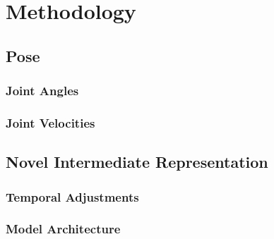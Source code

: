 
\chapter{Methodology} %

\label{Methodology} %

\section{Pose}

\subsection{Joint Angles}

\subsection{Joint Velocities}

\section{Novel Intermediate Representation}

\subsection{Temporal Adjustments}

\subsection{Model Architecture}